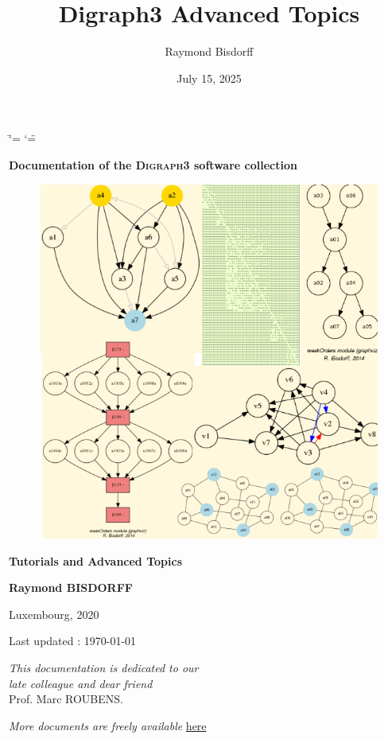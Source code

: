\documentclass[a4paper,12pt,english]{sphinxhowto}
\title{Digraph3 Advanced Topics}
\date{July 15, 2025}
\author{Raymond Bisdorff}
\begin{document}
\ifdefined\shorthandoff
  \ifnum\catcode`\=\string=\active\shorthandoff{=}\fi
  \ifnum\catcode`\"=\active{}\fi
\fi

\pagestyle{empty}


    \begin{titlepage}
        \centering

        \vspace*{10mm} %
        \textbf{\Large {Documentation of the \textsc{Digraph3} software collection}}

        \vspace{5mm}
        \begin{figure}[!h]
            \centering
            \includegraphics[scale=0.5]{introDoc3.png}
        \end{figure}

        \vspace{10mm}
        \textbf{\Huge {Tutorials and Advanced Topics}}

        \textbf{Raymond BISDORFF}

        \small Luxembourg,  2020

        \small  Last updated : \today
        
        \vspace{10mm}
        \begin{center}
        \emph{This documentation is dedicated to our}\\
        \emph{late colleague and dear friend}\\
         Prof. Marc ROUBENS.
        \end{center}

        \vfill
        \textit{More documents are freely available }{\href{https://digraph3.readthedocs.io/en/latest}{here}}
    \end{titlepage}
\end{document}
